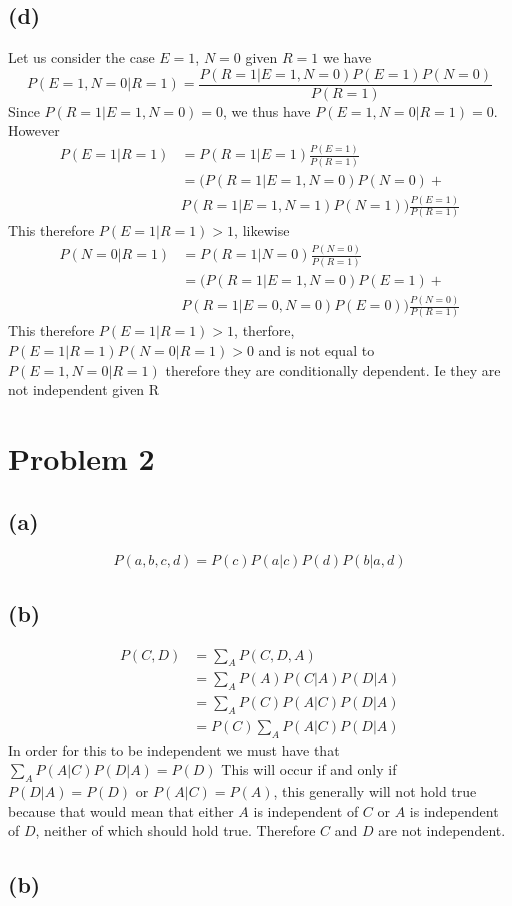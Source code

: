 \documentclass[12pt]{article}
\begin{document}
\subsection*{(d)}
Let us consider the case $E=1$, $N=0$ given $R=1$ we have
$$P(E=1,N=0|R=1)=\frac{P(R=1|E=1,N=0)P(E=1)P(N=0)}{P(R=1)}$$
Since $P(R=1|E=1,N=0)=0$, we thus have $P(E=1,N=0|R=1)=0$. However 
\begin{align*}
    P(E=1|R=1)&=P(R=1|E=1)\frac{P(E=1)}{P(R=1)}\\
    &=(P(R=1|E=1,N=0)P(N=0)+\\
    &P(R=1|E=1,N=1)P(N=1))\frac{P(E=1)}{P(R=1)}
\end{align*}
This therefore $P(E=1|R=1)>1$, likewise
\begin{align*}
    P(N=0|R=1)&=P(R=1|N=0)\frac{P(N=0)}{P(R=1)}\\
    &=(P(R=1|E=1,N=0)P(E=1)+\\
    &P(R=1|E=0,N=0)P(E=0))\frac{P(N=0)}{P(R=1)}
\end{align*}
This therefore $P(E=1|R=1)>1$, therfore, $P(E=1|R=1)P(N=0|R=1)>0$ and is not equal to $P(E=1,N=0|R=1)$ therefore they are conditionally dependent.
Ie they are not independent given R
\section*{Problem 2}
\subsection*{(a)}
$$\boxed{P(a,b,c,d)=P(c)P(a|c)P(d)P(b|a,d)}$$
\subsection*{(b)}
\begin{align*}
    P(C,D)&=\sum_{A}P(C,D,A)\\
    &=\sum_{A}P(A)P(C|A)P(D|A)\\
    &=\sum_{A}P(C)P(A|C)P(D|A)\\
    &=P(C)\sum_{A}P(A|C)P(D|A)
\end{align*}
In order for this to be independent we must have that $\sum_{A}P(A|C)P(D|A)=P(D)$
This will occur if and only if $P(D|A)=P(D)$ or $P(A|C)=P(A)$, this generally will not hold true because that would
mean that either $A$ is independent of $C$ or $A$ is independent of $D$, neither of which should hold true.
Therefore $C$ and $D$ are not independent.
\subsection*{(b)}
 
\end{document}
